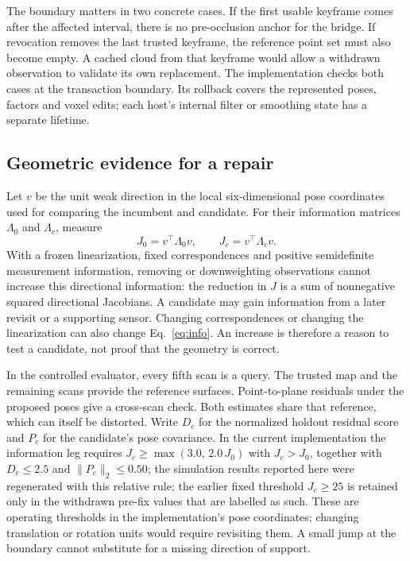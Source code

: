 \documentclass[conference]{IEEEtran}
\begin{document}
The boundary matters in two concrete cases. If the first usable keyframe comes after the affected interval, there is no pre-occlusion anchor for the bridge. If revocation removes the last trusted keyframe, the reference point set must also become empty. A cached cloud from that keyframe would allow a withdrawn observation to validate its own replacement. The implementation checks both cases at the transaction boundary. Its rollback covers the represented poses, factors and voxel edits; each host's internal filter or smoothing state has a separate lifetime.

\subsection{Geometric evidence for a repair}
Let $v$ be the unit weak direction in the local six-dimensional pose coordinates used for comparing the incumbent and candidate. For their information matrices $\Lambda_0$ and $\Lambda_c$, measure
\begin{equation}
 J_0=v^\top\Lambda_0 v,\qquad J_c=v^\top\Lambda_c v.
 \label{eq:info}
\end{equation}
With a frozen linearization, fixed correspondences and positive semidefinite measurement information, removing or downweighting observations cannot increase this directional information: the reduction in $J$ is a sum of nonnegative squared directional Jacobians. A candidate may gain information from a later revisit or a supporting sensor. Changing correspondences or changing the linearization can also change Eq.~\eqref{eq:info}. An increase is therefore a reason to test a candidate, not proof that the geometry is correct.

In the controlled evaluator, every fifth scan is a query. The trusted map and the remaining scans provide the reference surfaces. Point-to-plane residuals under the proposed poses give a cross-scan check. Both estimates share that reference, which can itself be distorted. Write $D_c$ for the normalized holdout residual score and $P_c$ for the candidate's pose covariance. In the current implementation the information leg requires $J_c\ge\max(3.0,\,2.0\,J_0)$ with $J_c>J_0$, together with $D_c\leq2.5$ and $\lVert P_c\rVert_2\leq0.50$; the simulation results reported here were regenerated with this relative rule; the earlier fixed threshold $J_c\geq25$ is retained only in the withdrawn pre-fix values that are labelled as such. These are operating thresholds in the implementation's pose coordinates; changing translation or rotation units would require revisiting them. A small jump at the boundary cannot substitute for a missing direction of support.
\end{document}
